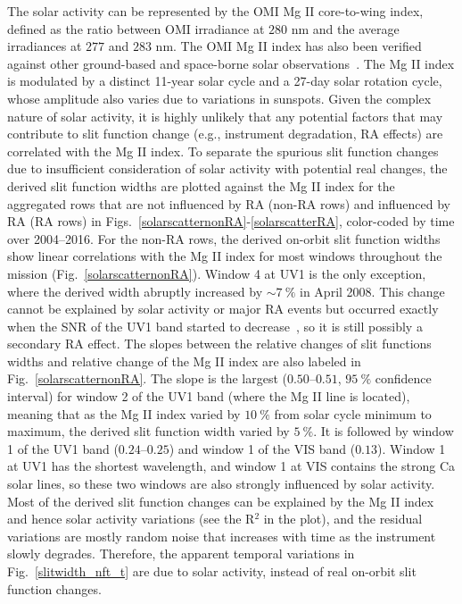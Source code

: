 \documentclass[amt,manuscript]{copernicus}
\begin{document}
The solar activity can be represented by the OMI Mg II core-to-wing index, defined as the ratio between OMI irradiance at $280$ nm and the average irradiances at $277$ and $283$ nm. The OMI Mg II index has also been verified against other ground-based and space-borne solar observations~\citep{deland2013the}. The Mg II index is modulated by a distinct 11-year solar cycle and a 27-day solar rotation cycle, whose amplitude also varies due to variations in sunspots. Given the complex nature of solar activity, it is highly unlikely that any potential factors that may contribute to slit function change (e.g., instrument degradation, RA effects) are correlated with the Mg II index. To separate the spurious slit function changes due to insufficient consideration of solar activity with potential real changes, the derived slit function widths are plotted against the Mg II index for the aggregated rows that are not influenced by RA (non-RA rows) and influenced by RA (RA rows) in Figs.~\ref{solarscatternonRA}-\ref{solarscatterRA}, color-coded by time over 2004--2016. For the non-RA rows, the derived on-orbit slit function widths show linear correlations with the Mg II index for most windows throughout the mission (Fig.~\ref{solarscatternonRA}). Window 4 at UV1 is the only exception, where the derived width abruptly increased by $\sim 7~\%$ in April 2008. This change cannot be explained by solar activity or major RA events but occurred exactly when the SNR of the UV1 band started to decrease~\citep{huang2017}, so it is still possibly a secondary RA effect. The slopes between the relative changes of slit functions widths and relative change of the Mg II index are also labeled in Fig.~\ref{solarscatternonRA}. The slope is the largest ($0.50$--$0.51$, $95~\%$ confidence interval) for window 2 of the UV1 band (where the Mg II line is located), meaning that as the Mg II index varied by $10~\%$ from solar cycle minimum to maximum, the derived slit function width varied by $5~\%$. It is followed by window 1 of the UV1 band ($0.24$--$0.25$) and window 1 of the VIS band ($0.13$). Window 1 at UV1 has the shortest wavelength, and window 1 at VIS contains the strong Ca solar lines, so these two windows are also strongly influenced by solar activity. Most of the derived slit function changes can be explained by the Mg II index and hence solar activity variations (see the R$^2$ in the plot), and the residual variations are mostly random noise that increases with time as the instrument slowly degrades. Therefore, the apparent temporal variations in Fig.~\ref{slitwidth_nft_t} are due to solar activity, instead of real on-orbit slit function changes.
\end{document}
